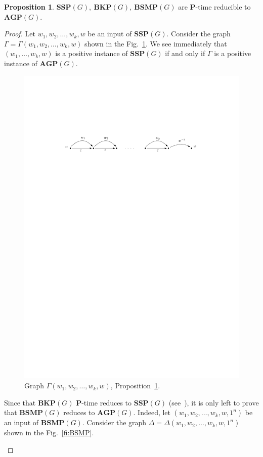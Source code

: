 \documentclass[10pt]{amsart}
\theoremstyle{definition}
\newtheorem{proposition}[theorem]{Proposition}
\def\P{{\mathbf{P}}}
\def\SSP{{\mathbf{SSP}}}
\def\BSMP{{\mathbf{BSMP}}}
\def\BKP{{\mathbf{BKP}}}
\def\AGP{{\mathbf{AGP}}}
\begin{document}
\begin{proposition}\label{pr:reduction_to_agp}
$\SSP(G),\ \BKP(G),\ \BSMP(G)$ are $\P$-time reducible to $\AGP(G)$.
\end{proposition}
\begin{proof} Let $w_1,w_2,\ldots, w_k, w$ be an input of $\SSP(G)$. Consider the graph $\Gamma=\Gamma(w_1,w_2,\ldots,w_k,w)$ shown in the Fig.~\ref{fi:SSP}. We see immediately that $(w_1,\ldots,w_k,w)$ is a positive instance of $\SSP(G)$ if and only if $\Gamma$ is a positive instance of $\AGP(G)$.
\begin{figure}[h]
 \centering
 \includegraphics[width=4.5in]{ssp}
 \caption{Graph $\Gamma(w_1,w_2,\ldots,w_k,w)$, Proposition~\ref{pr:reduction_to_agp}.}\label{fi:SSP}
\end{figure}
Since that $\BKP(G)$ $\P$-time reduces to $\SSP(G)$ (see~\cite{Miasnikov-Nikolaev-Ushakov:2014a}), it is only left to prove that $\BSMP(G)$ reduces to $\AGP(G)$. Indeed, let $(w_1,w_2,\ldots,w_k,w,1^n)$ be an input of $\BSMP(G)$. Consider the graph $\Delta=\Delta(w_1,w_2,\ldots,w_k,w,1^n)$ shown in the Fig.~\ref{fi:BSMP}.
\begin{figure}[h]

\end{figure}
\end{proof}
\end{document}
